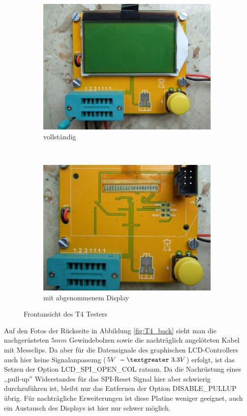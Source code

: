 \begin{figure}[H]
  \begin{subfigure}[b]{9cm}
    \centering
    \includegraphics[width=9cm]{../PNG/T4_front.JPG}
    \caption{vollständig}
  \end{subfigure}
  ~
  \begin{subfigure}[b]{9cm}
    \centering
    \includegraphics[width=9cm]{../PNG/T4_front_noLCD.JPG}
    \caption{mit abgenommenem Display}
  \end{subfigure}
  \caption{Frontansicht des T4 Testers}
  \label{fig:T4_front}
\end{figure}

Auf den Fotos der Rückseite in Abbildung \ref{fig:T4_back} sieht man die nachgerüsteten
\(5mm\) Gewindebolzen sowie die nachträglich angelöteten Kabel mit Messclips.
Da aber für die Datensignale des graphischen LCD-Controllers auch hier
keine Signalanpassung (\(5V~-\textgreater ~3.3V\)) erfolgt, ist das Setzen der Option LCD\_SPI\_OPEN\_COL ratsam.
Da die Nachrüstung eines ,,pull-up'' Widerstandes für das SPI-Reset Signal hier
aber schwierig durchzuführen ist, bleibt nur das Entfernen der Option
DISABLE\_PULLUP übrig. 
Für nachträgliche Erweiterungen ist diese Platine weniger geeignet, auch ein Austausch des
Displays ist hier nur schwer möglich.

